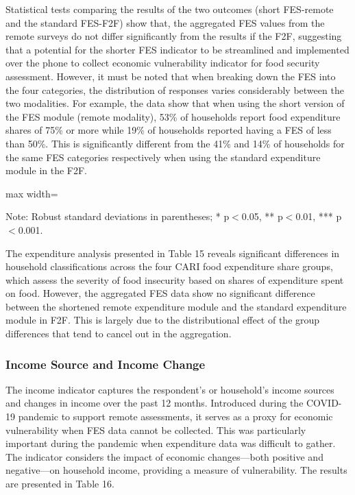 \documentclass[11pt,harvard]{article}
\begin{document}
	Statistical tests comparing the results of the two outcomes (short FES-remote and the standard FES-F2F) show that, the aggregated FES values from the remote surveys do not differ significantly from the results if the F2F, suggesting that a potential for the shorter FES indicator to be streamlined and implemented over the phone to collect economic vulnerability indicator for food security assessment. However, it must be noted that when breaking down the FES into the four categories, the distribution of responses varies considerably between the two modalities. For example, the data show that when using the short version of the FES module (remote modality), 53\% of households report food expenditure shares of 75\% or more while 19\% of households reported having a FES of less than 50\%. This is significantly different from the 41\% and 14\% of households for the same FES categories respectively when using the standard expenditure module in the F2F.
	
	\begin{table}[htbp]
		\centering
		\begin{adjustbox}{max width=\textwidth}%
			\begin{threeparttable}
				\caption{Impact of Survey Modality on Food Expenditure Share}
				\scriptsize%
				 
				\label{tab:FES_Modality_BF}
				\begin{tablenotes}
					\item Note: Robust standard deviations in parentheses; * p$<$0.05, ** p$<$0.01, *** p$<$0.001.
				\end{tablenotes}
			\end{threeparttable}
		\end{adjustbox}
	\end{table}
	
	The expenditure analysis presented in Table 15 reveals significant differences in household classifications across the four CARI food expenditure share groups, which assess the severity of food insecurity based on shares of expenditure spent on food. However, the aggregated FES data show no significant difference between the shortened remote expenditure module and the standard expenditure module in F2F. This is largely due to the distributional effect of the group differences that tend to cancel out in the aggregation.
	
	\subsubsection{Income Source and Income Change}
	The income indicator captures the respondent's or household's income sources and changes in income over the past 12 months. Introduced during the COVID-19 pandemic to support remote assessments, it serves as a proxy for economic vulnerability when FES data cannot be collected. This was particularly important during the pandemic when expenditure data was difficult to gather. The indicator considers the impact of economic changes—both positive and negative—on household income, providing a measure of vulnerability. The results are presented in Table 16.
\end{document}
